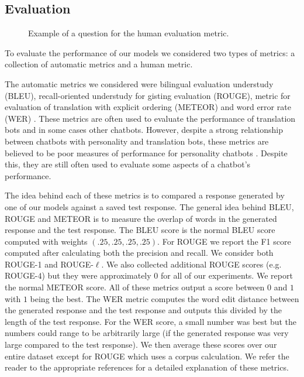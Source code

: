 \subsection{Evaluation}
\begin{figure}[t]
	\begin{center}
	\end{center}
	\caption{Example of a question for the human evaluation metric.}
	\label{fig:human_eval_question}
\end{figure}
To evaluate the performance of our models we considered two types of metrics: a collection of automatic metrics and a human metric.

The automatic metrics we considered were bilingual evaluation understudy (BLEU), recall-oriented understudy for gisting evaluation (ROUGE), metric for evaluation of translation with explicit ordering (METEOR) and word error rate (WER) \cite{Papineni:2002:BMA:1073083.1073135, lin-2004-rouge, denkowski:lavie:meteor-wmt:2014}.
These metrics are often used to evaluate the performance of translation bots and in some cases other chatbots.
However, despite a strong relationship between chatbots with personality and translation bots, these metrics are believed to be poor measures of performance for personality chatbots \cite{Radz2017, Xing2018, LiuLSNCP16, SerbanLCP15}.
Despite this, they are still often used to evaluate some aspects of a chatbot's performance.

The idea behind each of these metrics is to compared a response generated by one of our models against a saved test response.
The general idea behind BLEU, ROUGE and METEOR is to measure the overlap of words in the generated response and the test response.
The BLEU score is the normal BLEU score computed with weights $(.25,.25,.25,.25)$.
For ROUGE we report the  F1 score computed after calculating both the precision and recall.
We consider both ROUGE-1 and ROUGE-$\ell$.
We also collected additional ROUGE scores (e.g. ROUGE-$4$) but they were approximately $0$ for all of our experiments.
We report the normal METEOR score.
All of these metrics output a score between $0$ and $1$ with $1$ being the best.
The WER metric computes the word edit distance between the generated response and the test response and outputs this divided by the length of the test response. 
For the WER score, a small number was best but the numbers could range to be arbitrarily large (if the generated response was very large compared to the test response).
We then average these scores over our entire dataset except for ROUGE which uses a corpus calculation.
We refer the reader to the appropriate references for a detailed explanation of these metrics.

